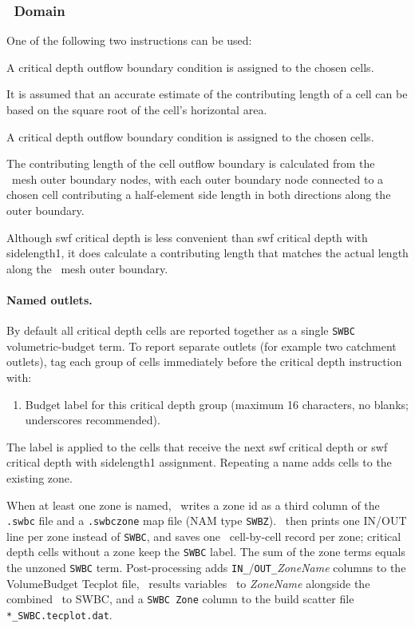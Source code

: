 \subsubsection{\swf\ Domain}
One of the following two instructions can be used:

    {
          A critical depth outflow boundary condition is assigned to the chosen cells.

          It is assumed that an accurate estimate of the contributing length of a cell can be based on the square root of the cell's horizontal area.
    }

    {
          A critical depth outflow boundary condition is assigned to the chosen cells.

          The contributing length of the cell outflow boundary is calculated from the \swf\ mesh outer boundary nodes, with each outer boundary node connected to a chosen cell contributing a half-element side length in both directions along the outer boundary.
    }

Although {\sf swf critical depth} is less convenient than {\sf swf critical depth with sidelength1}, it does calculate a contributing length that matches the actual length along the \swf\ mesh outer boundary.

\paragraph{Named outlets.}
By default all critical depth cells are reported together as a single \texttt{SWBC} volumetric-budget term. To report separate outlets (for example two catchment outlets), tag each group of cells immediately before the critical depth instruction with:

    {
        \squish
        \begin{enumerate}
        \item {}   Budget label for this critical depth group (maximum 16 characters, no blanks; underscores recommended).
        \end{enumerate}
          The label is applied to the cells that receive the next {\sf swf critical depth} or {\sf swf critical depth with sidelength1} assignment. Repeating a name adds cells to the existing zone.
    }

When at least one zone is named, \mut\ writes a zone id as a third column of the \texttt{.swbc} file and a \texttt{.swbczone} map file (NAM type \texttt{SWBZ}). \mfus\ then prints one IN/OUT line per zone instead of \texttt{SWBC}, and saves one \swf\ cell-by-cell record per zone; critical depth cells without a zone keep the \texttt{SWBC} label. The sum of the zone terms equals the unzoned \texttt{SWBC} term. Post-processing adds \texttt{IN\_}/\texttt{OUT\_}{\em ZoneName} columns to the VolumeBudget Tecplot file, \swf\ results variables \swf\ to {\em ZoneName} alongside the combined \swf\ to SWBC, and a \texttt{SWBC Zone} column to the build scatter file \texttt{*\_SWBC.tecplot.dat}.

